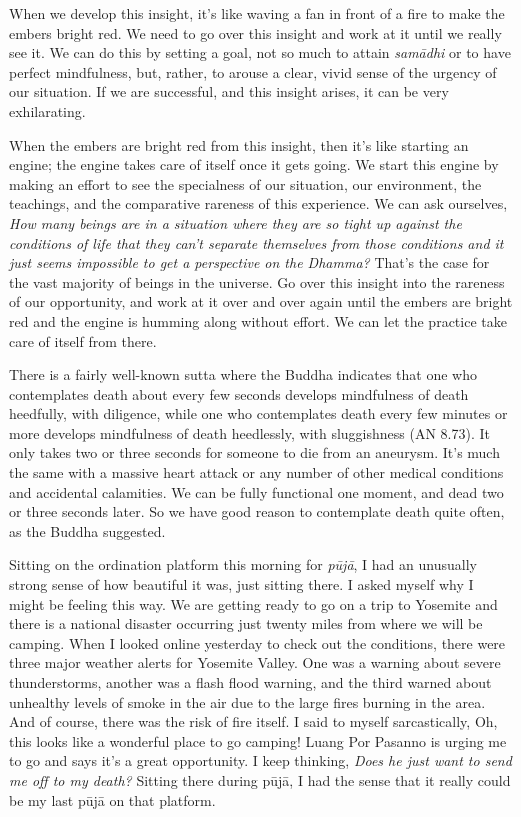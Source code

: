 When we develop this insight, it's like waving a fan in front of a fire 
to make the embers bright red. We need to go over this insight and work 
at it until we really see it. We can do this by setting a goal, not so 
much to attain \emph{samādhi} or to have perfect mindfulness, but, 
rather, to arouse a clear, vivid sense of the urgency of our situation. 
If we are successful, and this insight arises, it can be very 
exhilarating.

When the embers are bright red from this insight, then it's like 
starting an engine; the engine takes care of itself once it gets going. 
We start this engine by making an effort to see the specialness of our 
situation, our environment, the teachings, and the comparative rareness 
of this experience. We can ask ourselves, \emph{How many beings are in 
a situation where they are so tight up against the conditions of life 
that they can't separate themselves from those conditions and it just 
seems impossible to get a perspective on the Dhamma?} That's the case 
for the vast majority of beings in the universe. Go over this insight 
into the rareness of our opportunity, and work at it over and over 
again until the embers are bright red and the engine is humming along 
without effort. We can let the practice take care of itself from there.


There is a fairly well-known sutta where the Buddha indicates that one 
who contemplates death about every few seconds develops mindfulness of 
death heedfully, with diligence, while one who contemplates death every 
few minutes or more develops mindfulness of death heedlessly, with 
sluggishness (AN 8.73). It only takes two or three seconds for someone 
to die from an aneurysm. It's much the same with a massive heart attack 
or any number of other medical conditions and accidental calamities. We 
can be fully functional one moment, and dead two or three seconds 
later. So we have good reason to contemplate death quite often, as the 
Buddha suggested.

Sitting on the ordination platform this morning for \emph{pūjā}, I 
had an unusually strong sense of how beautiful it was, just sitting 
there. I asked myself why I might be feeling this way. We are getting 
ready to go on a trip to Yosemite and there is a national disaster 
occurring just twenty miles from where we will be camping. When I 
looked online yesterday to check out the conditions, there were three 
major weather alerts for Yosemite Valley. One was a warning about 
severe thunderstorms, another was a flash flood warning, and the third 
warned about unhealthy levels of smoke in the air due to the large 
fires burning in the area. And of course, there was the risk of fire 
itself. I said to myself sarcastically, Oh, this looks like a wonderful 
place to go camping! Luang Por Pasanno is urging me to go and says it's 
a great opportunity. I keep thinking, \emph{Does he just want to send 
me off to my death?} Sitting there during pūjā, I had the sense that 
it really could be my last pūjā on that platform.

